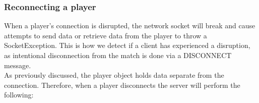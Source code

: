 \documentclass[11pt]{article}
\begin{document}
\newpage


\subsubsection{Reconnecting a player}

When a player's connection is disrupted, the network socket will break and cause attempts to send data or retrieve data from the player to throw a SocketException. This is how we detect if a client has experienced a disruption, as intentional disconnection from the match is done via a DISCONNECT message. \\

As previously discussed, the player object holds data separate from the connection. Therefore, when a player disconnects the server will perform the following: \\
\end{document}
